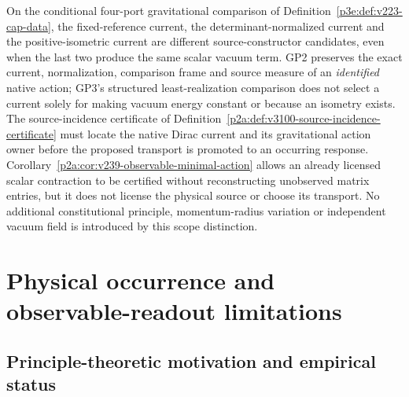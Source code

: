 \documentclass[12pt,a4paper]{article}
\begin{document}
\begin{remark}
\label{p2a:rem:v3028-marked-cap-incidence}
On the conditional four-port gravitational comparison of
Definition~\ref{p3e:def:v223-cap-data}, the fixed-reference current,
the determinant-normalized current and the positive-isometric current
are different source-constructor candidates, even when the last two
produce the same scalar vacuum term. GP2 preserves the exact current,
normalization, comparison frame and source measure of an \emph{identified}
native action; GP3's structured least-realization comparison does not
select a current solely for making vacuum energy constant or because
an isometry exists. The source-incidence certificate of
Definition~\ref{p2a:def:v3100-source-incidence-certificate}
must locate the native Dirac current and its gravitational action owner
before the proposed transport is promoted to an occurring response.
Corollary~\ref{p2a:cor:v239-observable-minimal-action}
allows an already licensed scalar contraction to be certified without
reconstructing unobserved matrix entries, but it does not license the
physical source or choose its transport.  No additional constitutional
principle, momentum-radius variation or independent vacuum field is
introduced by this scope distinction.
\end{remark}





\section{Physical occurrence and observable-readout limitations}
\label{p2a:sec:clean-observable-limits}
\subsection{Principle-theoretic motivation and empirical status}
\label{p2:app:axiom-motivation}
\end{document}
